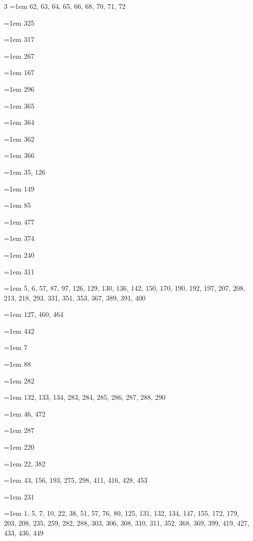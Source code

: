 \begin{multicols}{3}
\hangindent=1em  62, 63, 64, 65, 66, 68, 70, 71, 72\par
\hangindent=1em  325\par
\hangindent=1em  317\par
\hangindent=1em  267\par
\hangindent=1em  167\par
\hangindent=1em  296\par
\hangindent=1em  365\par
\hangindent=1em  364\par
\hangindent=1em  362\par
\hangindent=1em  366\par
\hangindent=1em  35, 126\par
\hangindent=1em  149\par
\hangindent=1em  85\par
\hangindent=1em  477\par
\hangindent=1em  374\par
\hangindent=1em  240\par
\hangindent=1em  311\par
\hangindent=1em  5, 6, 57, 87, 97, 126, 129, 130, 136, 142, 150, 170, 190, 192, 197, 207, 208, 213, 218, 293, 331, 351, 353, 367, 389, 391, 400\par
\hangindent=1em  127, 460, 464\par
\hangindent=1em  442\par
\hangindent=1em  7\par
\hangindent=1em  88\par
\hangindent=1em  282\par
\hangindent=1em  132, 133, 134, 283, 284, 285, 286, 287, 288, 290\par
\hangindent=1em  46, 472\par
\hangindent=1em  287\par
\hangindent=1em  220\par
\hangindent=1em  22, 382\par
\hangindent=1em  43, 156, 193, 275, 298, 411, 416, 428, 453\par
\hangindent=1em  231\par
\hangindent=1em  1, 5, 7, 10, 22, 38, 51, 57, 76, 80, 125, 131, 132, 134, 147, 155, 172, 179, 203, 208, 235, 259, 282, 288, 303, 306, 308, 310, 311, 352, 368, 369, 399, 419, 427, 433, 436, 449\par

\end{multicols}
